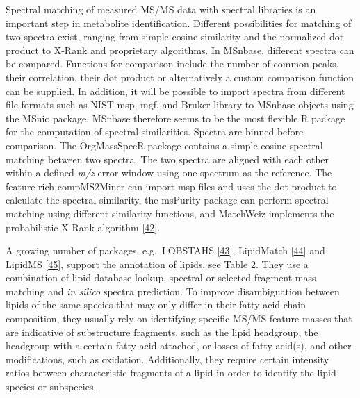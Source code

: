 \documentclass[]{article}
\begin{document}
Spectral matching of measured MS/MS data with spectral libraries is an important step in metabolite identification. Different possibilities for matching of two spectra exist, ranging from simple cosine similarity and the normalized dot product to X-Rank and proprietary algorithms. In MSnbase, different spectra can be compared. Functions for comparison include the number of common peaks, their correlation, their dot product or alternatively a custom comparison function can be supplied. In addition, it will be possible to import spectra from different file formats such as NIST msp, mgf, and Bruker library to MSnbase objects using the MSnio package. MSnbase therefore seems to be the most flexible R package for the computation of spectral similarities. Spectra are binned before comparison. The OrgMassSpecR package contains a simple cosine spectral matching between two spectra. The two spectra are aligned with each other within a defined \emph{m/z} error window using one spectrum as the reference. The feature-rich compMS2Miner can import msp files and uses the dot product to calculate the spectral similarity, the msPurity package can perform spectral matching using different similarity functions, and MatchWeiz implements the probabilistic X-Rank algorithm {[}\protect\hyperlink{ref-mylonas_2009}{42}{]}.

A growing number of packages, e.g.~LOBSTAHS {[}\protect\hyperlink{ref-collins_2016}{43}{]}, LipidMatch {[}\protect\hyperlink{ref-koelmel_2017}{44}{]} and LipidMS {[}\protect\hyperlink{ref-alcorizabalaguer_2018}{45}{]}, support the annotation of lipids, see Table 2. They use a combination of lipid database lookup, spectral or selected fragment mass matching and \emph{in silico} spectra prediction. To improve disambiguation between lipids of the same species that may only differ in their fatty acid chain composition, they usually rely on identifying specific MS/MS feature masses that are indicative of substructure fragments, such as the lipid headgroup, the headgroup with a certain fatty acid attached, or losses of fatty acid(s), and other modifications, such as oxidation. Additionally, they require certain intensity ratios between characteristic fragments of a lipid in order to identify the lipid species or subspecies.
\end{document}
